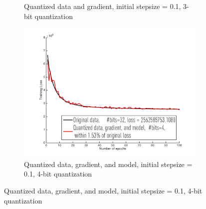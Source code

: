 \documentclass{article}
\begin{document}
\begin{figure}[h]
\begin{subfigure}[h]{.3\columnwidth}
    \caption{Quantized data and gradient, initial stepsize = 0.1, 3-bit quantization}
    \end{subfigure}
    \begin{subfigure}[h]{.3\columnwidth}
    \includegraphics[width=\columnwidth]{lr/real/cadata/dgm01}
     \caption{Quantized data, gradient, and model, initial stepsize = 0.1, 4-bit quantization}
    \end{subfigure}
    

\end{figure}
\end{document}
